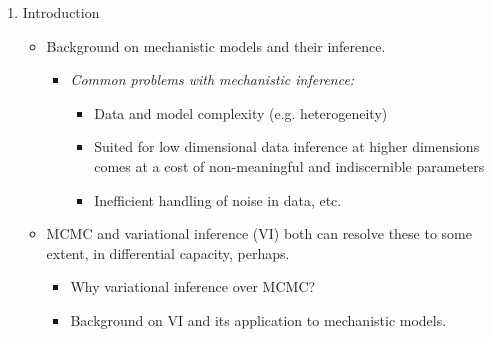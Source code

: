 \documentclass[12pt]{article} %
\begin{document}
\begin{enumerate}[label=\Alph*.]
    \item Introduction
    
    \begin{itemize}
        \item Background on mechanistic models and their inference. 
        \begin{itemize}
            \item \textit{Common problems with mechanistic inference: }
            \begin{itemize}[label=$\circ$]
                \item Data and model complexity (e.g. heterogeneity)
                \item Suited for low dimensional data inference at higher dimensions comes at a cost of non-meaningful and indiscernible parameters
                \item Inefficient handling of noise in data, etc.
            \end{itemize}
        \end{itemize}
        
        \item MCMC and variational inference (VI) both can resolve these to some extent, in differential capacity, perhaps.
        \begin{itemize}
            \item Why variational inference over MCMC?
            \item Background on VI  and its application to mechanistic models.
        \end{itemize}
    \end{itemize}



\end{enumerate}



\end{document}
